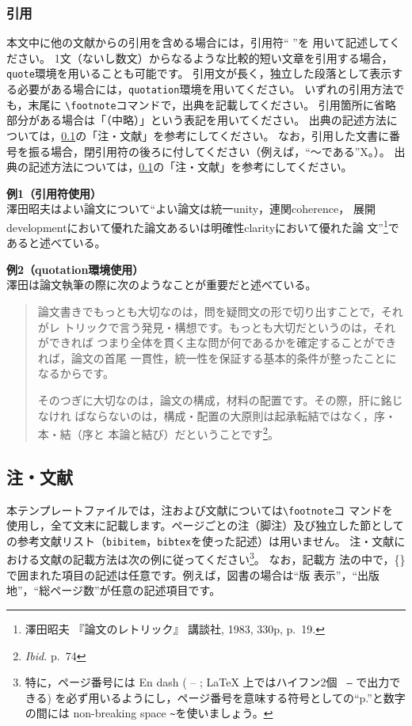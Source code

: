 \documentclass[b5paper,10pt,twocolumn,tombow]{jarticle}
\begin{document}
\subsubsection{引用}
本文中に他の文献からの引用を含める場合には，引用符`` ''を
用いて記述してください。
1文（ないし数文）からなるような比較的短い文章を引用する場合，\texttt{quote}環境を用いることも可能です。
引用文が長く，独立した段落として表示する必要がある場合には，\texttt{quotation}環境を用いてください。
いずれの引用方法でも，末尾に
\verb|\footnote|コマンドで，出典を記載してください。
引用箇所に省略部分がある場合は「（中略）」という表記を用いてください。
出典の記述方法については，\ref{123950_27Oct08}の「注・文献」を参考にしてください。
なお，引用した文書に番号を振る場合，閉引用符の後ろに付してください（例えば，``～である''X。）。
出典の記述方法については，\ref{123950_27Oct08}の「注・文献」を参考にしてください。

\noindent{}\textbf{例1（引用符使用）}\\
澤田昭夫はよい論文について``よい論文は統一unity，連関coherence，
展開developmentにおいて優れた論文あるいは明確性clarityにおいて優れた論
文''\footnote{澤田昭夫 『論文のレトリック』 講談社, 1983, 330p, p.~19.}であると述べている。

\noindent{}\textbf{例2（quotation環境使用）}\\
澤田は論文執筆の際に次のようなことが重要だと述べている。
\begin{quotation}
  論文書きでもっとも大切なのは，問を疑問文の形で切り出すことで，それがレ
  トリックで言う発見・構想です。もっとも大切だというのは，それができれば
  つまり全体を貫く主な問が何であるかを確定することができれば，論文の首尾
  一貫性，統一性を保証する基本的条件が整ったことになるからです。

  そのつぎに大切なのは，論文の構成，材料の配置です。その際，肝に銘じなけれ
  ばならないのは，構成・配置の大原則は起承転結ではなく，序・本・結（序と
  本論と結び）だということです\footnote{\textit{Ibid.} p.~74}。
\end{quotation}


\subsection{注・文献} \label{123950_27Oct08}
本テンプレートファイルでは，注および文献については\verb|\footnote|コ
マンドを
使用し，全て文末に記載します。ページごとの注（脚注）及び独立した節としての参考文献リスト（\texttt{bibitem}，\texttt{bibtex}を使った記述）は用いません。
注・文献における文献の記載方法は次の例に従ってください\footnote{特に，ページ番号には En dash ( -- ; \LaTeX{} 上ではハイフン2個 \texttt{ --} で出力できる) を必ず用いるようにし，ページ番号を意味する符号としての``p.''と数字の間には non-breaking space \texttt{\~}を使いましょう。}。
なお，記載方
法の中で，\{\}で囲まれた項目の記述は任意です。例えば，図書の場合は``版
表示''，``出版地''，``総ページ数''が任意の記述項目です。
\end{document}
